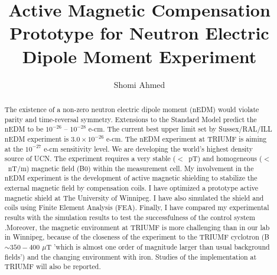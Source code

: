 
\title{Active Magnetic Compensation Prototype for Neutron Electric Dipole Moment Experiment}
\author{Shomi Ahmed}

%
%
%





\maketitle

\begin{abstract}
The existence of a non-zero neutron electric dipole moment (nEDM) would violate parity and time-reversal symmetry.  Extensions to the Standard Model predict the nEDM to be $10^{-26}$ -- $10^{-28}$ e-cm.  The current best upper limit set by Sussex/RAL/ILL nEDM experiment is $3.0 \times 10^{-26}$ e-cm\cite{bestLim_1,bestLim_2}.  The nEDM experiment at TRIUMF is aiming at the $10^{-27}$ e-cm sensitivity level.  We are developing the world's highest density source of UCN.  The experiment requires a very stable ($<$~pT) and homogeneous ($<$~nT/m) magnetic field (B0) within the measurement cell.  My involvement in the nEDM experiment is the development of active magnetic shielding to stabilize the external magnetic field by compensation coils.  I have optimized a prototype active magnetic shield at The University of Winnipeg. I have also simulated the shield and coils using Finite Element Analysis (FEA). Finally,  I have compared my experimental results with the simulation results to test the successfulness of the control system .Moreover, the magnetic environment at TRIUMF is more challenging than in our lab in Winnipeg, because of the closeness of the experiment to the TRIUMF cyclotron (B $\sim 350 - 400$ $\mu$T 'which is almost one order of magnitude larger than usual background fields') and the changing environment with iron.  Studies of the implementation at TRIUMF will also be reported.

\end{abstract}

\newpage
\tableofcontents
{}
\listoffigures
\listoftables


